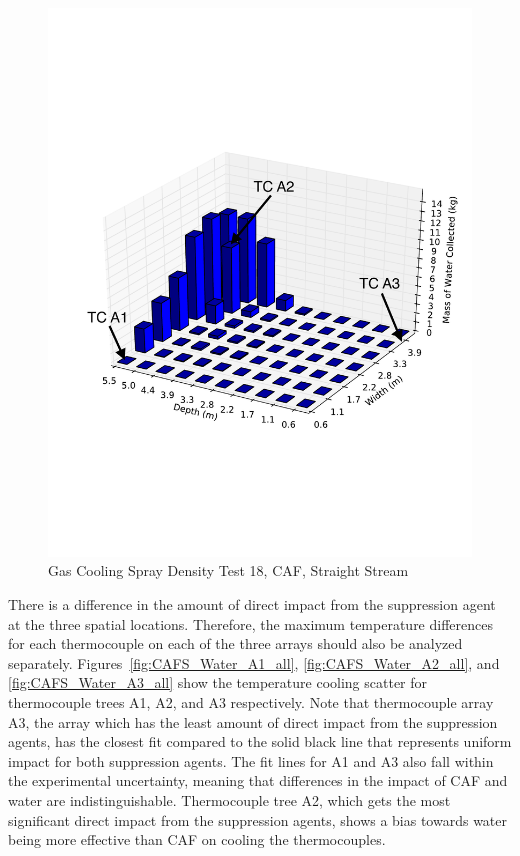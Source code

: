 \documentclass[12pt,oneside]{book}
\begin{document}
\begin{figure}[!ht]
	\includegraphics[width=.7\columnwidth]{../Figures/Bars/BB18b}
	\caption{Gas Cooling Spray Density Test 18, CAF, Straight Stream}
	\label{fig:Burn_Building_Test_18b}
\end{figure}

There is a difference in the amount of direct impact from the suppression agent at the three spatial locations. Therefore, the maximum temperature differences for each thermocouple on each of the three arrays should also be analyzed separately. Figures~\ref{fig:CAFS_Water_A1_all}, \ref{fig:CAFS_Water_A2_all}, and \ref{fig:CAFS_Water_A3_all} show the temperature cooling scatter for thermocouple trees A1, A2, and A3 respectively. Note that thermocouple array A3, the array which has the least amount of direct impact from the suppression agents, has the closest fit compared to the solid black line that represents uniform impact for both suppression agents. The fit lines for A1 and A3 also fall within the experimental uncertainty, meaning that differences in the impact of CAF and water are indistinguishable. Thermocouple tree A2, which gets the most significant direct impact from the suppression agents, shows a bias towards water being more effective than CAF on cooling the thermocouples. 
\end{document}
